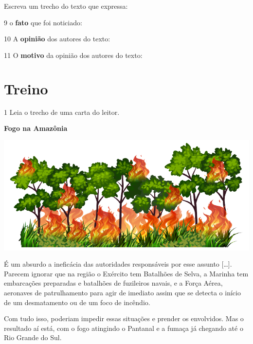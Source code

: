 Escreva um trecho do texto que expressa:
\vspace{2em}


\num{9} o \textbf{fato} que foi noticiado: 


\num{10} A \textbf{opinião} dos autores do texto: 


\num{11} O \textbf{motivo} da opinião dos autores do texto: 


\section*{Treino}

\num{1} Leia o trecho de uma carta do leitor.

\begin{myquote}
\textbf{Fogo na Amazônia}

\begin{center}
\includegraphics[width=\textwidth]{media/image28b.png}
\end{center}

É um absurdo a ineficácia das autoridades responsáveis por esse assunto
{[}\ldots{}{]}. Parecem ignorar que na região o Exército tem Batalhões
de Selva, a Marinha tem embarcações preparadas e batalhões de fuzileiros
navais, e a Força Aérea, aeronaves de patrulhamento para agir de
imediato assim que se detecta o início de um desmatamento ou de um foco
de incêndio.

Com tudo isso, poderiam impedir essas situações e prender os envolvidos.
Mas o resultado aí está, com o fogo atingindo o Pantanal e a fumaça já
chegando até o Rio Grande do Sul.

\end{myquote}


